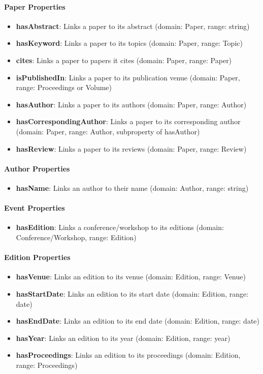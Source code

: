 \documentclass[10pt,a4paper]{article}
\begin{document}
\paragraph{Paper Properties}
\begin{itemize}
    \item \textbf{hasAbstract}: Links a paper to its abstract (domain: Paper, range: string)
    \item \textbf{hasKeyword}: Links a paper to its topics (domain: Paper, range: Topic)
    \item \textbf{cites}: Links a paper to papers it cites (domain: Paper, range: Paper)
    \item \textbf{isPublishedIn}: Links a paper to its publication venue (domain: Paper, range: Proceedings or Volume)
    \item \textbf{hasAuthor}: Links a paper to its authors (domain: Paper, range: Author)
    \item \textbf{hasCorrespondingAuthor}: Links a paper to its corresponding author (domain: Paper, range: Author, subproperty of hasAuthor)
    \item \textbf{hasReview}: Links a paper to its reviews (domain: Paper, range: Review)
\end{itemize}

\paragraph{Author Properties}
\begin{itemize}
    \item \textbf{hasName}: Links an author to their name (domain: Author, range: string)
\end{itemize}

\paragraph{Event Properties}
\begin{itemize}
    \item \textbf{hasEdition}: Links a conference/workshop to its editions (domain: Conference/Workshop, range: Edition)
\end{itemize}

\paragraph{Edition Properties}
\begin{itemize}
    \item \textbf{hasVenue}: Links an edition to its venue (domain: Edition, range: Venue)
    \item \textbf{hasStartDate}: Links an edition to its start date (domain: Edition, range: date)
    \item \textbf{hasEndDate}: Links an edition to its end date (domain: Edition, range: date)
    \item \textbf{hasYear}: Links an edition to its year (domain: Edition, range: year)
    \item \textbf{hasProceedings}: Links an edition to its proceedings (domain: Edition, range: Proceedings)
\end{itemize}
\end{document}
